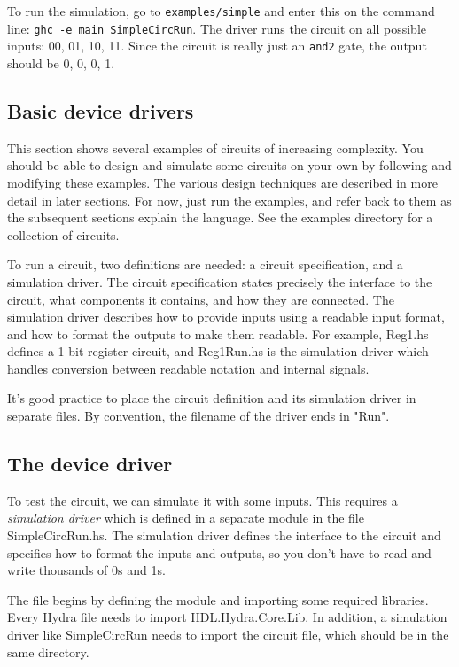 \documentclass[]{svmono}
\begin{document}
To run the simulation, go to \texttt{examples/simple} and enter this on the
command line: \texttt{ghc -e main SimpleCircRun}.  The driver runs the
circuit on all possible inputs: 00, 01, 10, 11.  Since the circuit is
really just an \texttt{and2} gate, the output should be 0, 0, 0, 1.
\subsection*{Basic device drivers}
\label{sec:org867a288}

This section shows several examples of circuits of increasing
complexity.  You should be able to design and simulate some circuits on
your own by following and modifying these examples.  The various
design techniques are described in more detail in later sections.  For
now, just run the examples, and refer back to them as the subsequent
sections explain the language.  See the examples directory for a
collection of circuits.

To run a circuit, two definitions are needed: a circuit specification,
and a simulation driver.  The circuit specification states precisely
the interface to the circuit, what components it contains, and how
they are connected.  The simulation driver describes how to provide
inputs using a readable input format, and how to format the outputs to
make them readable.  For example, Reg1.hs defines a 1-bit register
circuit, and Reg1Run.hs is the simulation driver which handles
conversion between readable notation and internal signals.

It's good practice to place the circuit definition and its simulation
driver in separate files.  By convention, the filename of the driver
ends in "Run".
\subsection*{The device driver}
\label{sec:orgbec4f50}

To test the circuit, we can simulate it with some inputs.  This
requires a \emph{simulation driver} which is defined in a separate module
in the file SimpleCircRun.hs.  The simulation driver defines the
interface to the circuit and specifies how to format the inputs and
outputs, so you don't have to read and write thousands of 0s and 1s.

The file begins by defining the module and importing some required
libraries.  Every Hydra file needs to import HDL.Hydra.Core.Lib.  In
addition, a simulation driver like SimpleCircRun needs to import the
circuit file, which should be in the same directory.
\end{document}
